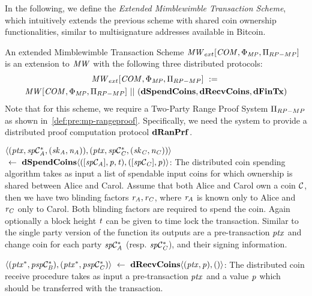 In the following, we define the \emph{Extended Mimblewimble Transaction Scheme}, which intuitively extends the previous scheme with shared coin ownership functionalities, similar to multisignature addresses available in Bitcoin.

\begin{definition}
    \label{def:atom:ext-mw-tx-scheme}
    An extended Mimblewimble Transaction Scheme $\mathit{MW}_{ext}[\mathit{COM},\Phi_{\mathit{MP}},\Pi_{RP-MP}]$ is an extension to $\mathit{MW}$ with the following three distributed protocols:
    \begin{gather*}
        \mathit{MW}_{ext}[\mathit{COM},\Phi_{\mathit{MP}},\Pi_{RP-MP}] ~:=~ \\ \mathit{MW}[\mathit{COM},\Phi_{\mathit{MP}},\Pi_{RP-MP}] ~||~ (\mathbf{dSpendCoins},\mathbf{dRecvCoins}, \mathbf{dFinTx})
    \end{gather*}
    Note that for this scheme, we require a Two-Party Range Proof System $\Pi_{RP-MP}$ as shown in~\cref{def:pre:mp-rangeproof}.
    Specifically, we need the system to provide a distributed proof computation protocol $\mathbf{dRanPrf}$.
    \begin{asparaitem}
        \item $\langle (\mathit{ptx}, \mathit{sp}\mathcal{C}_{\mathit{A}}^*, (\mathit{sk}_{\mathit{A}},\mathit{\mathit{n}_{\mathit{A}}})), (\mathit{ptx}, \mathit{sp}\mathcal{C}_{\mathit{C}}^*, (\mathit{sk}_{\mathit{C}},\mathit{\mathit{n}_{\mathit{C}}})) \rangle$ \\
        $~\leftarrow~ \mathbf{dSpendCoins} \langle ([\mathit{sp}\mathcal{C}_{\mathit{A}}],\mathit{p},\mathit{t}), ([\mathit{sp}\mathcal{C}_{\mathit{C}}],\mathit{p}) \rangle$:
        The distributed coin spending algorithm takes as input a list of spendable input coins for which ownership is shared between Alice and Carol.
        Assume that both Alice and Carol own a coin $\mathcal{C}$, then we have two blinding factors $\mathit{r}_{\mathit{A}}, \mathit{r}_{\mathit{C}}$, where $\mathit{r}_{\mathit{A}}$ is known only to Alice and $\mathit{r}_{\mathit{C}}$ only to Carol.
        Both blinding factors are required to spend the coin.
        Again optionally a block height $\mathit{t}$ can be given to time lock the transaction.
        Similar to the single party version of the function its outputs are a pre-transaction $\mathit{ptx}$ and change coin for each party $\mathit{sp}\mathcal{C}_{\mathit{A}}^*$ (resp. $\mathit{sp}\mathcal{C}_{\mathit{C}}^*$), and their signing information.
        \item $\langle (\mathit{ptx}^*, \mathit{psp}\mathcal{C}_{\mathit{B}}^*), (\mathit{ptx}^*, \mathit{psp}\mathcal{C}_{\mathit{C}}^*) \rangle ~\leftarrow~ \mathbf{dRecvCoins} \langle(\mathit{ptx},\mathit{p}), () \rangle$: The distributed coin receive procedure takes as input a pre-transaction $\mathit{ptx}$ and a value $\mathit{p}$ which should be transferred with the transaction.

\end{asparaitem}
\end{definition}
